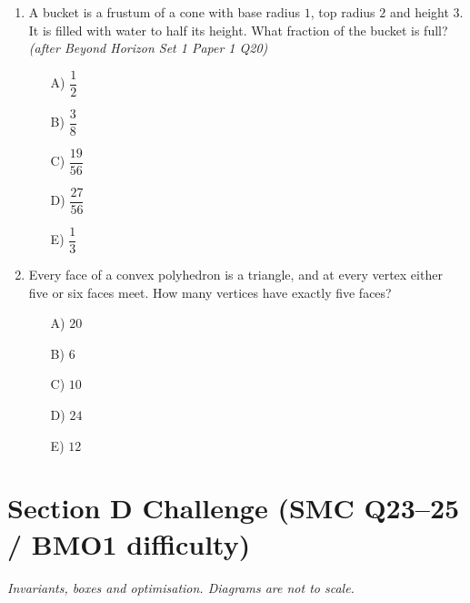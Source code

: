 \documentclass[11pt,a4paper]{article}
\begin{document}
\begin{enumerate}
\item A bucket is a frustum of a cone with base radius $1$, top radius $2$ and height $3$. It is filled with water to half its height. What fraction of the bucket is full? \textit{\small(after Beyond Horizon Set 1 Paper 1 Q20)}
\begin{itemize}[itemsep=3pt]
\item[A)] $\dfrac12$
\item[B)] $\dfrac38$
\item[C)] $\dfrac{19}{56}$
\item[D)] $\dfrac{27}{56}$
\item[E)] $\dfrac13$
\end{itemize}

\item Every face of a convex polyhedron is a triangle, and at every vertex either five or six faces meet. How many vertices have exactly five faces?
\begin{itemize}
\item[A)] $20$
\item[B)] $6$
\item[C)] $10$
\item[D)] $24$
\item[E)] $12$
\end{itemize}

\end{enumerate}

\section*{Section D \quad Challenge \hfill{\normalfont\small(SMC Q23--25 / BMO1 difficulty)}}

\noindent\textit{Invariants, boxes and optimisation. Diagrams are not to scale.}
\end{document}
